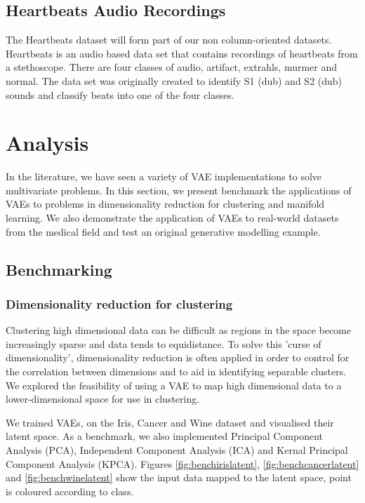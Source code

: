 \documentclass[12pt]{article}
\begin{document}
\subsection{Heartbeats Audio Recordings}
The Heartbeats dataset \citep{pascal-chsc-2011} will form part of our non column-oriented datasets. \newline 
Heartbeats is an audio based data set that contains recordings of heartbeats from a stethoscope. There are four classes of audio, artifact, extrahls, murmer and normal. The data set was originally created to identify S1 (dub) and S2 (dub) sounds and classify beats into one of the four classes.  

\section{Analysis}
In the literature, we have seen a variety of VAE implementations to solve multivariate problems. In this section, we present benchmark the applications of VAEs to problems in dimensionality reduction for clustering and manifold learning. We also demonstrate the application of VAEs to real-world datasets from the medical field and test an original generative modelling example. 

\subsection{Benchmarking}

\subsubsection{Dimensionality reduction for clustering}


Clustering high dimensional data can be difficult as regions in the space become increasingly sparse and data tends to equidistance. To solve this 'curse of dimensionality', dimensionality reduction is often applied in order to control for the correlation between dimensions and to aid in identifying separable clusters. We explored the feasibility of using a VAE to map high dimensional data to a lower-dimensional space for use in clustering.

We trained VAEs, on the Iris, Cancer and Wine dataset and visualised their latent space. As a benchmark, we also implemented Principal Component Analysis (PCA), Independent Component Analysis (ICA) and Kernal Principal Component Analysis (KPCA). Figures \ref{fig:benchirislatent}, \ref{fig:benchcancerlatent} and \ref{fig:benchwinelatent} show the input data mapped to the latent space, point is coloured according to class. 
\end{document}
